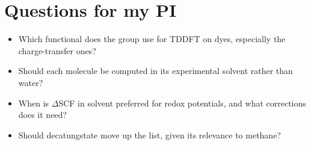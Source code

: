 \documentclass[11pt,a4paper]{article}
\begin{document}
\section*{Questions for my PI}
\begin{itemize}
  \item Which functional does the group use for TDDFT on dyes, especially the charge-transfer
  ones?
  \item Should each molecule be computed in its experimental solvent rather than water?
  \item When is $\Delta$SCF in solvent preferred for redox potentials, and what corrections does it
  need?
  \item Should decatungstate move up the list, given its relevance to methane?
\end{itemize}
\end{document}

